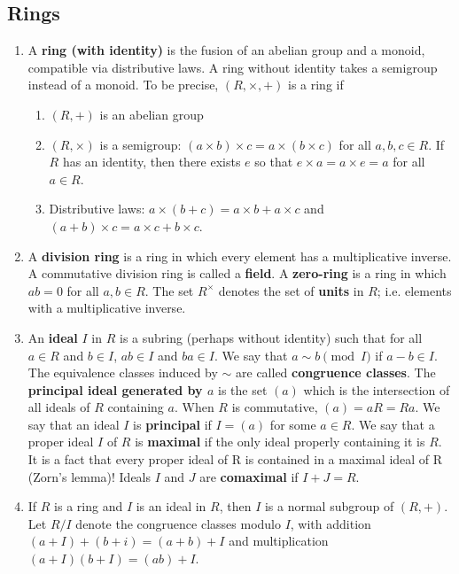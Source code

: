 \documentclass[12pt, a4paper]{article}
\theoremstyle{nonumberplain}
\begin{document}
\subsection{Rings}
\begin{enumerate}[nolistsep]
    \item A \textbf{ring (with identity)} is the fusion of an abelian group and a monoid, compatible via distributive laws.
        A ring without identity takes a semigroup instead of a monoid.
        To be precise, $(R,\times,+)$ is a ring if
        \begin{enumerate}[nolistsep]
            \item $(R,+)$ is an abelian group
            \item $(R,\times)$ is a semigroup: $(a\times b)\times c=a\times(b\times c)$ for all $a,b,c\in R$.
                If $R$ has an identity, then there exists $e$ so that $e\times a=a\times e=a$ for all $a\in R$.
            \item Distributive laws: $a\times(b+c)=a\times b+a\times c$ and $(a+b)\times c=a\times c+b\times c$.
        \end{enumerate}
    \item A \textbf{division ring} is a ring in which every element has a multiplicative inverse.
        A commutative division ring is called a \textbf{field}.
        A \textbf{zero-ring} is a ring in which $ab=0$ for all $a,b\in R$.
        The set $R^\times$ denotes the set of \textbf{units} in $R$; i.e. elements with a multiplicative inverse.
    \item An \textbf{ideal} $I$ in $R$ is a subring (perhaps without identity) such that for all $a\in R$ and $b\in I$, $ab\in I$ and $ba\in I$.
        We say that $a\sim b\pmod{I}$ if $a-b\in I$.
        The equivalence classes induced by $\sim$ are called \textbf{congruence classes}.
        The \textbf{principal ideal generated by $a$} is the set $(a)$ which is the intersection of all ideals of $R$ containing $a$.
        When $R$ is commutative, $(a)=aR=Ra$.
        We say that an ideal $I$ is \textbf{principal} if $I=(a)$ for some $a\in R$.
        We say that a proper ideal $I$ of $R$ is \textbf{maximal} if the only ideal properly containing it is $R$.
        It is a fact that every proper ideal of R is contained in a maximal ideal of R (Zorn's lemma)!
        Ideals $I$ and $J$ are \textbf{comaximal} if $I+J=R$.
    \item If $R$ is a ring and $I$ is an ideal in $R$, then $I$ is a normal subgroup of $(R,+)$.
        Let $R/I$ denote the congruence classes modulo $I$, with addition $(a+I)+(b+i)=(a+b)+I$ and multiplication $(a+I)(b+I)=(ab)+I$.

\end{enumerate}
\end{document}
